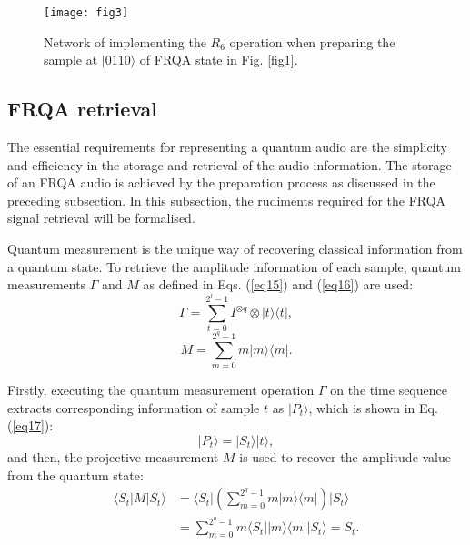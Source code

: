 \documentclass[10pt,journal,compsoc]{IEEEtran}
\begin{document}
\begin{figure}[!t]
\centering
\texttt{[image: fig3]}
\caption{Network of implementing the $R_6$ operation when preparing the sample at $\vert 0110\rangle$ of FRQA state in Fig. \ref{fig1}.}
\label{fig3}
\end{figure}

\subsection{FRQA retrieval}\label{sec2-3}
The essential requirements for representing a quantum audio are the simplicity and efficiency in the storage and retrieval of the audio information. The storage of an FRQA audio is achieved by the preparation process as discussed in the preceding subsection. In this subsection, the rudiments required for the FRQA signal retrieval will be formalised.

Quantum measurement is the unique way of recovering classical information from a quantum state. To retrieve the amplitude information of each sample, quantum measurements $\Gamma$ and $M$ as defined in Eqs. (\ref{eq15}) and (\ref{eq16}) are used:
\begin{equation}\label{eq15}
\Gamma = {\sum_{t = 0}^{2^l - 1}} I^{\otimes q} \otimes {\vert t \rangle} {\langle t \vert},
\end{equation}
\begin{equation}\label{eq16}
M = {\sum_{m = 0}^{2^q - 1}} m {\vert m \rangle} {\langle m \vert}.
\end{equation}

Firstly, executing the quantum measurement operation $\Gamma$ on the time sequence extracts corresponding information of sample $t$ as $\vert P_t \rangle$, which is shown in Eq. (\ref{eq17}):
\begin{equation}\label{eq17}
\vert P_t \rangle = {\vert S_t \rangle} {\vert t \rangle},
\end{equation}
and then, the projective measurement $M$ is used to recover the amplitude value from the quantum state:
\begin{equation}\label{eq18}
\begin{aligned}
{\langle S_t \vert} M {\vert S_t \rangle} & = {\langle S_t \vert} \left( {{\sum_{m = 0}^{2^q - 1}} m {\vert m \rangle} {\langle m \vert}} \right) {\vert S_t \rangle} \\
& = {\sum_{m = 0}^{2^q - 1}} m {\langle S_t \vert} {\vert m \rangle} {\langle m \vert} {\vert S_t \rangle} = S_t.
\end{aligned}
\end{equation}
\end{document}

